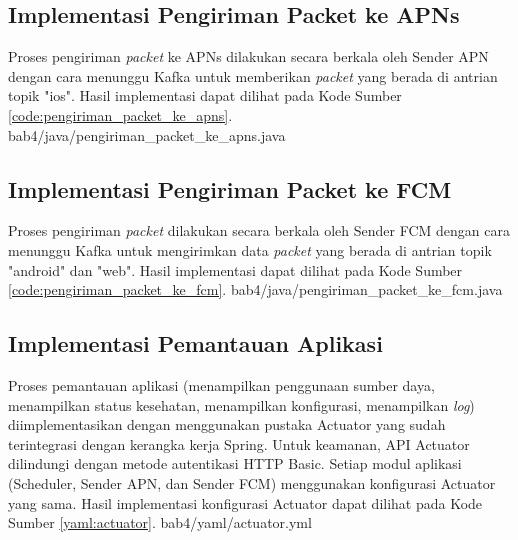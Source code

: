\subsection{Implementasi Pengiriman Packet ke APNs}
\par Proses pengiriman \textit{packet} ke APNs dilakukan secara berkala oleh Sender APN dengan cara menunggu Kafka untuk memberikan \textit{packet} yang berada di antrian topik "ios". Hasil implementasi dapat dilihat pada Kode Sumber \ref{code:pengiriman_packet_ke_apns}.
 {bab4/java/pengiriman_packet_ke_apns.java}

\subsection{Implementasi Pengiriman Packet ke FCM}
\par Proses pengiriman \textit{packet} dilakukan secara berkala oleh Sender FCM dengan cara menunggu Kafka untuk mengirimkan data \textit{packet} yang berada di antrian topik "android" dan "web". Hasil implementasi dapat dilihat pada Kode Sumber \ref{code:pengiriman_packet_ke_fcm}.
 {bab4/java/pengiriman_packet_ke_fcm.java}

\subsection{Implementasi Pemantauan Aplikasi}
\par Proses pemantauan aplikasi (menampilkan penggunaan sumber daya, menampilkan status kesehatan, menampilkan konfigurasi, menampilkan \textit{log}) diimplementasikan dengan menggunakan pustaka Actuator yang sudah terintegrasi dengan kerangka kerja Spring. Untuk keamanan, API Actuator dilindungi dengan metode autentikasi HTTP Basic. Setiap modul aplikasi (Scheduler, Sender APN, dan Sender FCM) menggunakan konfigurasi Actuator yang sama. Hasil implementasi konfigurasi Actuator dapat dilihat pada Kode Sumber \ref{yaml:actuator}.
 {bab4/yaml/actuator.yml}
